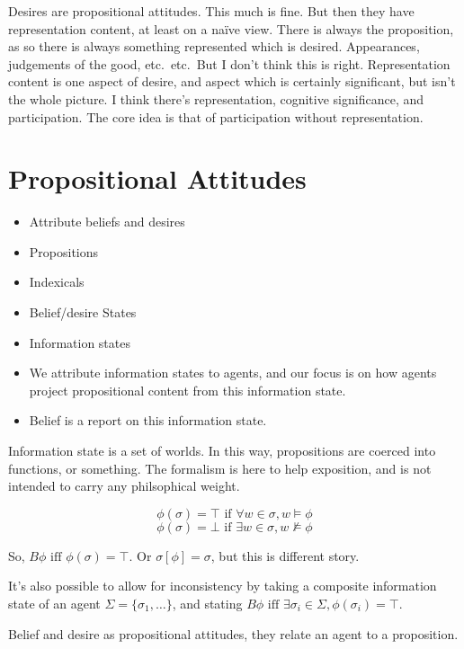\documentclass[10pt]{article}
\begin{document}
Desires are propositional attitudes.
This much is fine.
But then they have representation content, at least on a na\"{i}ve view.
There is always the proposition, as so there is always something represented which is desired.
Appearances, judgements of the good, etc.\ etc.\
But I don't think this is right.
Representation content is one aspect of desire, and aspect which is certainly significant, but isn't the whole picture.
I think there's representation, cognitive significance, and participation.
The core idea is that of participation without representation.



\section{Propositional Attitudes}
\label{sec:prop-attit}


\begin{itemize}
\item Attribute beliefs and desires
\item Propositions
\item Indexicals
\item Belief/desire States
\item Information states
\item We attribute information states to agents, and our focus is on how agents project propositional content from this information state.
\item Belief is a report on this information state.
\end{itemize}

Information state is a set of worlds.
In this way, propositions are coerced into functions, or something.
The formalism is here to help exposition, and is not intended to carry any philsophical weight.

\[\phi(\sigma) = \top \text{ if } \forall w \in \sigma, w \vDash \phi\]
\[\phi(\sigma) = \bot \text{ if } \exists w \in \sigma, w \nvDash \phi\]

So, \(B\phi \text{ iff } \phi(\sigma) = \top\).
Or \(\sigma[\phi] = \sigma\), but this is different story.

It's also possible to allow for inconsistency by taking a composite information state of an agent \(\Sigma = \{\sigma_{1}, \dots\}\), and stating \(B\phi \text{ iff } \exists \sigma_{i} \in \Sigma, \phi(\sigma_{i}) = \top\).





Belief and desire as propositional attitudes, they relate an agent to a proposition.
\end{document}
